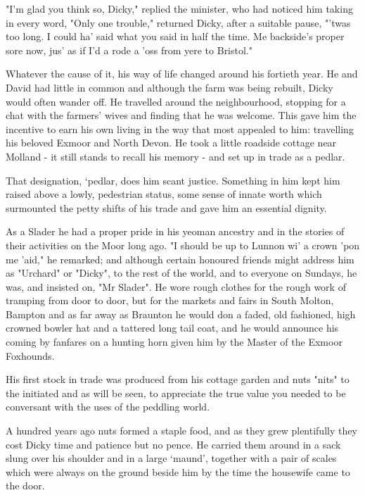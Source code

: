 "I'm glad you think so, Dicky," replied the minister, who had noticed him taking in every word,
 "Only one trouble," returned Dicky, after a suitable pause, "'twas too long. I could ha' said what you said in half the time. Me backside's proper sore now, jus' as if I'd a rode a 'oss from yere to Bristol."

Whatever the cause of it, his way of life changed around his fortieth year. He and David had little in common and although the farm was being rebuilt, Dicky would often wander off. He travelled around the neighbourhood, stopping for a chat with the farmers' wives and finding that he was welcome. This gave him the incentive to earn his own living in the way that most appealed to him: travelling his beloved Exmoor and North Devon. He took a little roadside cottage near Molland - it still stands to recall his memory - and set up in trade as a pedlar.

That designation, ‘pedlar, does him scant justice. Something in him kept him raised above a lowly, pedestrian status, some sense of innate worth which surmounted the petty shifts of his trade and gave him an essential dignity.

As a Slader he had a proper pride in his yeoman ancestry and in the stories of their activities on the Moor long ago. "I should be up to Lunnon wi' a crown 'pon me 'aid," he remarked; and although certain honoured friends might address him as "Urchard" or "Dicky", to the rest of the world, and to everyone on Sundays, he was, and insisted on, "Mr Slader". He wore rough clothes for the rough work of tramping from door to door, but for the markets and fairs in South Molton, Bampton and as far away as Braunton he would don a faded, old fashioned, high crowned bowler hat and a tattered long tail coat, and he would announce his coming by fanfares on a hunting horn given him by the Master of the Exmoor Foxhounds.

His first stock in trade was produced from his cottage garden and nuts   "nits" to the initiated   and as will be seen, to appreciate the true value you needed to be conversant with the uses of the peddling world.

A hundred years ago nuts formed a staple food, and as they grew plentifully they cost Dicky time and patience but no pence. He carried them around in a sack slung over his shoulder and in a large ‘maund’, together with a pair of scales which were always on the ground beside him by the time the housewife came to the door.

